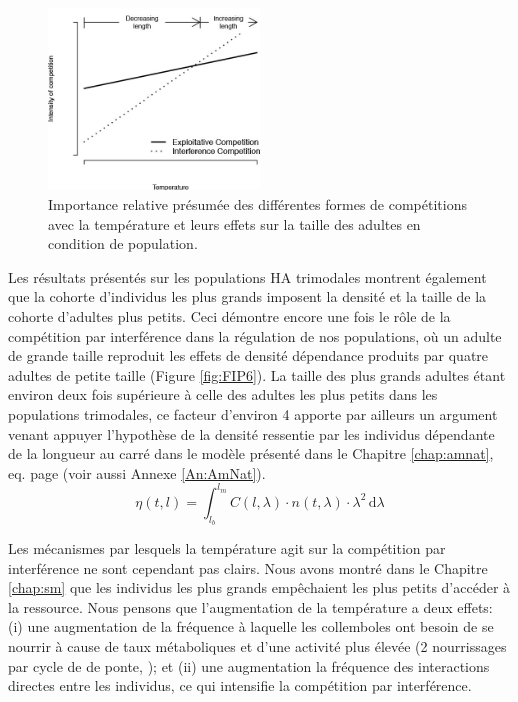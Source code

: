 \begin{figure}[!ht]
\begin{center}
\includegraphics[width=0.5\textwidth]{1_CorpsDeThese/Resumes/Fig/FIP07b}
\caption[Importance relative
des différentes formes de compétitions]{Importance relative présumée
des différentes formes de compétitions avec la température et leurs effets sur
la taille des adultes en condition de population.}
\label{fig:FIP7b}
\end{center}
\end{figure}

Les résultats présentés sur les populations HA trimodales montrent également que
la cohorte d'individus les plus grands imposent la densité et la taille de la
cohorte d'adultes plus petits. Ceci démontre encore une fois le rôle de la
compétition par interférence dans la régulation de nos populations, où un
adulte de grande taille reproduit les effets de densité dépendance produits par
quatre adultes de petite taille (Figure \ref{fig:FIP6}). La taille des plus
grands adultes étant environ deux fois supérieure à celle des adultes les plus petits dans les populations
trimodales, ce facteur d'environ 4 apporte par ailleurs un argument venant
appuyer l'hypothèse de la densité ressentie par les individus dépendante de la
longueur au carré dans le modèle présenté dans le Chapitre \ref{chap:amnat}, eq.
 page \pageref{eq_an2} (voir aussi Annexe \ref{An:AmNat}). $$
\eta(t,l)=\int_{l_b}^{l_m} \! C(l,\lambda)\cdot n(t,\lambda)\cdot\lambda^2\, \mathrm{d}\lambda $$

Les mécanismes par lesquels la température agit sur la compétition par
interférence ne sont cependant pas clairs. Nous avons montré dans le Chapitre
\ref{chap:sm} que les individus les plus grands empêchaient les plus petits
d'accéder à la ressource. Nous pensons que l'augmentation de la température a
deux effets: (i) une augmentation de la fréquence à laquelle les collemboles
ont besoin de se nourrir à cause de taux métaboliques et d'une activité plus
élevée (2 nourrissages par cycle de de ponte, \citealp{palevody1974a});
et (ii) une augmentation la fréquence des interactions directes entre les
individus, ce qui intensifie la compétition par interférence.

